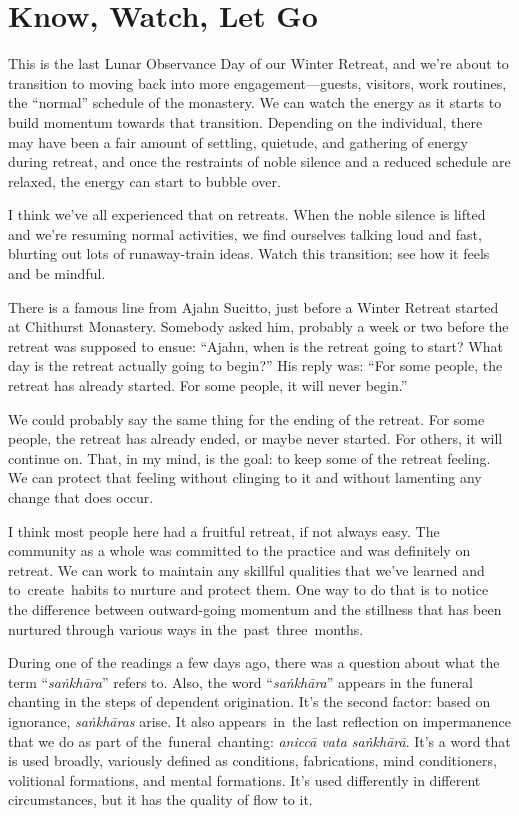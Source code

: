 
\chapter{Know, Watch, Let Go}


This is the last Lunar Observance Day of our Winter Retreat, and we're about to transition to moving back into more engagement---guests, visitors, work routines, the ``normal'' schedule of the monastery. We can watch the energy as it starts to build momentum towards that transition. Depending on the individual, there may have been a fair amount of settling, quietude, and gathering of energy during retreat, and once the restraints of noble silence and a reduced schedule are relaxed, the energy can start to bubble over.

I think we've all experienced that on retreats. When the noble silence is lifted and we're resuming normal activities, we find ourselves talking loud and fast, blurting out lots of runaway-train ideas. Watch this transition; see how it feels and be mindful.

There is a famous line from Ajahn Sucitto, just before a Winter Retreat started at Chithurst Monastery. Somebody asked him, probably a week or two before the retreat was supposed to ensue: ``Ajahn, when is the retreat going to start? What day is the retreat actually going to begin?'' His reply was: ``For some people, the retreat has already started. For some people, it will never begin.''

We could probably say the same thing for the ending of the retreat. For some people, the retreat has already ended, or maybe never started. For others, it will continue on. That, in my mind, is the goal: to keep some of the retreat feeling. We can protect that feeling without clinging to it and without lamenting any change that does occur.

I think most people here had a fruitful retreat, if not always easy. The community as a whole was committed to the practice and was definitely on retreat. We can work to maintain any skillful qualities that we've learned and \mbox{to create habits} to nurture and protect them. One way to do that is to notice the difference between outward-going momentum and the stillness that has been nurtured through various ways in \mbox{the past three months.}

During one of the readings a few days ago, there was a question about what the term ``\emph{saṅkhāra}'' refers to. Also, the word ``\emph{saṅkhāra}'' appears in the funeral chanting in the steps of dependent origination. It's the second factor: based on ignorance, \emph{saṅkhāras} arise. It also \mbox{appears in the} last reflection on impermanence that we do as part of \mbox{the funeral chanting:} \emph{aniccā vata saṅkhārā}. It's a word that is used broadly, variously defined as conditions, fabrications, mind conditioners, volitional formations, and mental formations. It's used differently in different circumstances, but it has the quality of flow to it.

